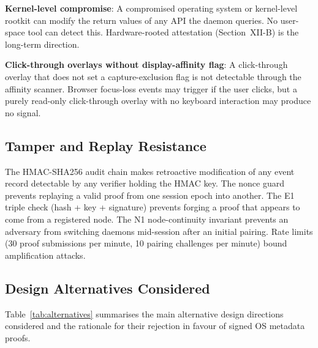 \documentclass[conference]{IEEEtran}
\begin{document}
\textbf{Kernel-level compromise}: A compromised operating system or kernel-level rootkit can modify the return values of any API the daemon queries. No user-space tool can detect this. Hardware-rooted attestation (Section~XII-B) is the long-term direction.

\textbf{Click-through overlays without display-affinity flag}: A click-through overlay that does not set a capture-exclusion flag is not detectable through the affinity scanner. Browser focus-loss events may trigger if the user clicks, but a purely read-only click-through overlay with no keyboard interaction may produce no signal.

\subsection{Tamper and Replay Resistance}

The HMAC-SHA256 audit chain makes retroactive modification of any event record detectable by any verifier holding the HMAC key. The nonce guard prevents replaying a valid proof from one session epoch into another. The E1 triple check (hash + key + signature) prevents forging a proof that appears to come from a registered node. The N1 node-continuity invariant prevents an adversary from switching daemons mid-session after an initial pairing. Rate limits (30 proof submissions per minute, 10 pairing challenges per minute) bound amplification attacks.

\subsection{Design Alternatives Considered}

Table~\ref{tab:alternatives} summarises the main alternative design directions considered and the rationale for their rejection in favour of signed OS metadata proofs.
\end{document}
